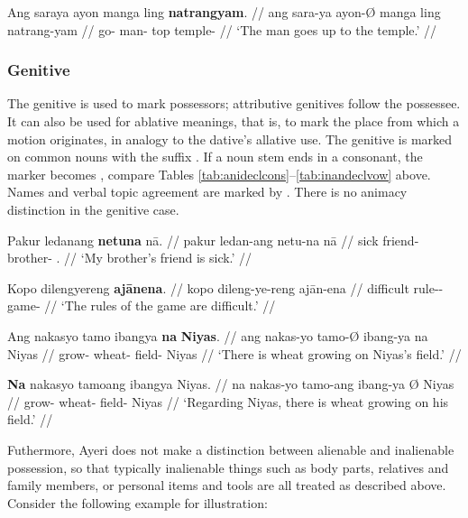 \a\label{ex:datlocprep}\begingl
	\gla Ang saraya ayon manga ling \textbf{natrangyam}. //
	\glb ang sara-ya ayon-Ø manga ling natrang-yam //
	\glc \AgtT{} go-\TsgM{} man-\Top{} \Dir{} top temple-\Dat{} //
	\glft `The man goes up to the temple.' //
\endgl

\xe


\subsubsection{Genitive}
\label{subsubsec:genitive}

The genitive is used to mark possessors; attributive genitives follow the 
possessee. It can also be used for ablative meanings, that is, to mark the 
place from which a motion originates, in analogy to the dative's allative use. 
The genitive is marked on common nouns with the suffix . If a 
noun stem ends in a consonant, the marker becomes , compare 
Tables \ref{tab:anideclcons}–\ref{tab:inandeclvow} above. Names and verbal 
topic agreement are marked by . There is no animacy distinction in 
the genitive case.

\pex
\a\begingl
	\gla Pakur ledanang \textbf{netuna} nā. //
	\glb pakur ledan-ang netu-na nā //
	\glc sick friend-\Aarg{} brother-\Gen{} \Fsg{}.\Gen{} //
	\glft `My brother's friend is sick.' //
\endgl

\a\begingl
	\gla Kopo dilengyereng \textbf{ajānena}. //
	\glb kopo dileng-ye-reng ajān-ena //
	\glc difficult rule-\Pl{}-\AargI{} game-\Gen{} //
	\glft `The rules of the game are difficult.' //
\endgl

\a\begingl
	\gla Ang nakasyo tamo ibangya \textbf{na} \textbf{Niyas}. //
	\glb ang nakas-yo tamo-Ø ibang-ya na Niyas //
	\glc \AgtT{} grow-\TsgN{} wheat-\Top{} field-\Loc{} \Gen{} Niyas //
	\glft `There is wheat growing on Niyas's field.' //
\endgl

\a\begingl
	\gla \textbf{Na} nakasyo tamoang ibangya {} Niyas. //
	\glb na nakas-yo tamo-ang ibang-ya Ø Niyas //
	\glc \GenT{} grow-\TsgN{} wheat-\Aarg{} field-\Loc{} \Top{} Niyas //
	\glft `Regarding Niyas, there is wheat growing on his field.' //
\endgl

\xe

Futhermore, Ayeri does not make a distinction between alienable and inalienable
possession, so that typically inalienable things such as body parts, relatives
and family members, or personal items and tools are all treated as described
above. Consider the following example for illustration:

